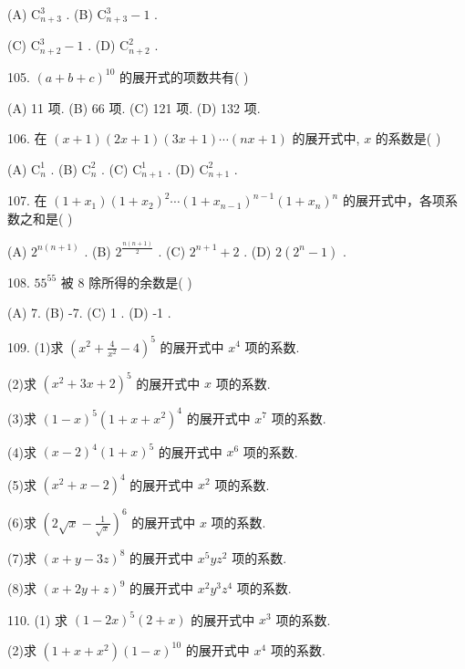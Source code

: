 \documentclass[10pt]{article}
\begin{document}
(A) \({\mathrm{C}}_{n + 3}^{3}\) . (B) \({\mathrm{C}}_{n + 3}^{3} - 1\) .

(C) \({\mathrm{C}}_{n + 2}^{3} - 1\) . (D) \({\mathrm{C}}_{n + 2}^{2}\) .

105. \({\left( a + b + c\right) }^{10}\) 的展开式的项数共有( )

(A) 11 项. (B) 66 项. (C) 121 项. (D) 132 项.

106. 在 \(\left( {x + 1}\right) \left( {{2x} + 1}\right) \left( {{3x} + 1}\right) \cdots \left( {{nx} + 1}\right)\) 的展开式中, \(x\) 的系数是( )

(A) \({\mathrm{C}}_{n}^{1}\) . (B) \({\mathrm{C}}_{n}^{2}\) . (C) \({\mathrm{C}}_{n + 1}^{1}\) . (D) \({\mathrm{C}}_{n + 1}^{2}\) .

107. 在 \(\left( {1 + {x}_{1}}\right) {\left( 1 + {x}_{2}\right) }^{2}\cdots {\left( 1 + {x}_{n - 1}\right) }^{n - 1}{\left( 1 + {x}_{n}\right) }^{n}\) 的展开式中，各项系数之和是( )

(A) \({2}^{n\left( {n + 1}\right) }\) . (B) \({2}^{\frac{n\left( {n + 1}\right) }{2}}\) . (C) \({2}^{n + 1} + 2\) . (D) \(2\left( {{2}^{n} - 1}\right)\) .

108. \({55}^{55}\) 被 8 除所得的余数是( )

(A) 7. (B) -7. (C) 1 . (D) -1 .

109. (1)求 \({\left( {x}^{2} + \frac{4}{{x}^{2}} - 4\right) }^{5}\) 的展开式中 \({x}^{4}\) 项的系数.

(2)求 \({\left( {x}^{2} + 3x + 2\right) }^{5}\) 的展开式中 \(x\) 项的系数.

(3)求 \({\left( 1 - x\right) }^{5}{\left( 1 + x + {x}^{2}\right) }^{4}\) 的展开式中 \({x}^{7}\) 项的系数.

(4)求 \({\left( x - 2\right) }^{4}{\left( 1 + x\right) }^{5}\) 的展开式中 \({x}^{6}\) 项的系数.

(5)求 \({\left( {x}^{2} + x - 2\right) }^{4}\) 的展开式中 \({x}^{2}\) 项的系数.

(6)求 \({\left( 2\sqrt{x} - \frac{1}{\sqrt{x}}\right) }^{6}\) 的展开式中 \(x\) 项的系数.

(7)求 \({\left( x + y - 3z\right) }^{8}\) 的展开式中 \({x}^{5}y{z}^{2}\) 项的系数.

(8)求 \({\left( x + 2y + z\right) }^{9}\) 的展开式中 \({x}^{2}{y}^{3}{z}^{4}\) 项的系数.

110. (1) 求 \({\left( 1 - 2x\right) }^{5}\left( {2 + x}\right)\) 的展开式中 \({x}^{3}\) 项的系数.

(2)求 \(\left( {1 + x + {x}^{2}}\right) {\left( 1 - x\right) }^{10}\) 的展开式中 \({x}^{4}\) 项的系数.
\end{document}
